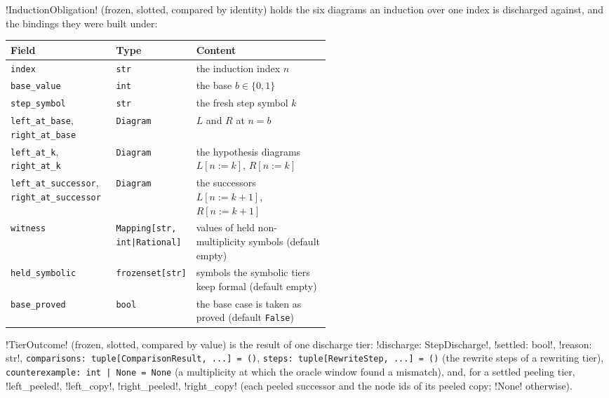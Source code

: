 \begin{definition}\label{def:kernel-obligation}
\py!InductionObligation! (frozen, slotted, compared by identity) holds the six diagrams an induction over one index is discharged against, and the bindings they were built under:
\begin{center}\small
\begin{tabularx}{\linewidth}{@{}>{\raggedright\arraybackslash}p{0.33\linewidth}>{\raggedright\arraybackslash}p{0.2\linewidth}X@{}}
\toprule
Field & Type & Content \\
\midrule
\texttt{index} & \texttt{str} & the induction index $n$ \\
\texttt{base\_value} & \texttt{int} & the base $b\in\{0,1\}$ \\
\texttt{step\_symbol} & \texttt{str} & the fresh step symbol $k$ \\
\texttt{left\_at\_base}, \texttt{right\_at\_base} & \texttt{Diagram} & $L$ and $R$ at $n=b$ \\
\texttt{left\_at\_k}, \texttt{right\_at\_k} & \texttt{Diagram} & the hypothesis diagrams $L[n:=k]$, $R[n:=k]$ \\
\texttt{left\_at\_successor}, \texttt{right\_at\_successor} & \texttt{Diagram} & the successors $L[n:=k+1]$, $R[n:=k+1]$ \\
\texttt{witness} & \texttt{Mapping[str, int|Rational]} & values of held non-multiplicity symbols (default empty) \\
\texttt{held\_symbolic} & \texttt{frozenset[str]} & symbols the symbolic tiers keep formal (default empty) \\
\texttt{base\_proved} & \texttt{bool} & the base case is taken as proved (default \texttt{False}) \\
\bottomrule
\end{tabularx}
\end{center}
\end{definition}

\begin{definition}\label{def:kernel-tier}
\py!TierOutcome! (frozen, slotted, compared by value) is the result of one discharge tier: \py!discharge: StepDischarge!, \py!settled: bool!, \py!reason: str!, \texttt{comparisons: tuple[ComparisonResult,\allowbreak{} .\allowbreak{}.\allowbreak{}.\allowbreak{}] = (\allowbreak{})}, \texttt{steps: tuple[RewriteStep,\allowbreak{} .\allowbreak{}.\allowbreak{}.\allowbreak{}] = (\allowbreak{})} (the rewrite steps of a rewriting tier), \texttt{counterexample: int | None = None} (a multiplicity at which the oracle window found a mismatch), and, for a settled peeling tier, \py!left_peeled!, \py!left_copy!, \py!right_peeled!, \py!right_copy! (each peeled successor and the node ids of its peeled copy; \py!None! otherwise).
\end{definition}

